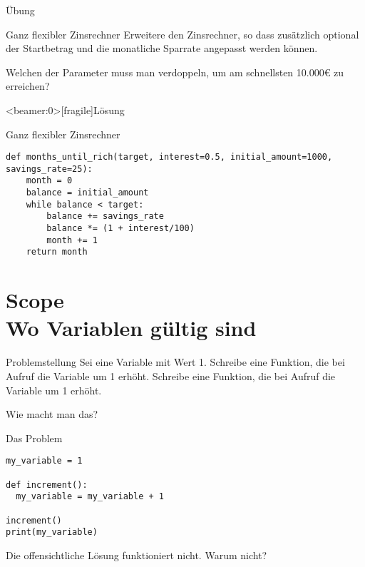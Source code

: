 \begin{frame}{Übung}
\begin{block}{Ganz flexibler Zinsrechner}
\vspace{2pt}
Erweitere den Zinsrechner, so dass zusätzlich optional der Startbetrag und die monatliche Sparrate angepasst werden können. 	

Welchen der Parameter muss man verdoppeln, um am schnellsten 10.000€ zu erreichen? 
\end{block}
\end{frame}

\begin{frame}<beamer:0>[fragile]{Lösung}

\begin{solutionblock}{Ganz flexibler Zinsrechner}
\begin{verbatim}
def months_until_rich(target, interest=0.5, initial_amount=1000, savings_rate=25):
    month = 0
    balance = initial_amount
    while balance < target:
        balance += savings_rate
        balance *= (1 + interest/100)
        month += 1
    return month
\end{verbatim}
\end{solutionblock}
\end{frame}



\section{Scope \\ \footnotesize Wo Variablen gültig sind}


\begin{frame}
\begin{block}{Problemstellung}
\vspace{2pt}
Sei  eine Variable mit Wert 1. 
Schreibe eine Funktion, die bei Aufruf die Variable  um 1 erhöht. 
Schreibe eine Funktion, die bei Aufruf die Variable  um 1 erhöht. 

\vspace{8pt}

Wie macht man das? 
\end{block}
\end{frame}

\begin{fragile}
	
\begin{block}{Das Problem}
\vspace{2pt}

\begin{verbatim}
my_variable = 1

def increment(): 
  my_variable = my_variable + 1

increment()
print(my_variable)
\end{verbatim}

\pause 
Die offensichtliche Lösung 
funktioniert nicht. Warum nicht? 
\end{block}
\end{fragile}


